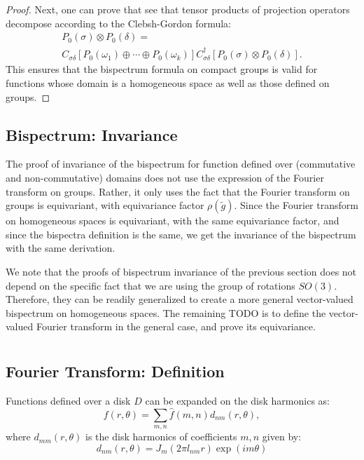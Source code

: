 \documentclass{article}
\begin{document}
\begin{proof}
Next, one can prove that see that tensor products of projection operators decompose according to the Clebsh-Gordon formula:
$$
\begin{gathered}
P_0(\sigma) \otimes P_0(\delta)= \\
C_{\sigma \delta}\left[P_0\left(\omega_1\right) \oplus \cdots \oplus P_0\left(\omega_k\right)\right] C_{\sigma \delta}^{\dagger}\left[P_0(\sigma) \otimes P_0(\delta)\right] .
\end{gathered}
$$
This ensures that the bispectrum formula on compact groups is valid for functions whose domain is a homogeneous space as well as those defined on groups.
\end{proof}

\subsection{Bispectrum: Invariance}

The proof of invariance of the bispectrum for function defined over (commutative and non-commutative) domains does not use the expression of the Fourier transform on groups. Rather, it only uses the fact that the Fourier transform on groups is equivariant, with equivariance factor $\rho(\tilde{g})$. Since the Fourier transform on homogeneous spaces is equivariant, with the same equivariance factor, and since the bispectra definition is the same, we get the invariance of the bispectrum with the same derivation.

We note that the proofs of bispectrum invariance of the previous section does not depend on the specific fact that we are using the group of rotations $SO(3)$. Therefore, they can be readily generalized to create a more general vector-valued bispectrum on homogeneous spaces. The remaining TODO is to define the vector-valued Fourier transform in the general case, and prove its equivariance.

\section{}


\subsection{Fourier Transform: Definition}

Functions defined over a disk $D$ can be expanded on the disk harmonics as:
\begin{equation}
    f(r, \theta)=\sum_{m, n} \hat{f}(m, n) d_{n m}(r, \theta),
\end{equation}
where $ d_{m m}(r, \theta)$ is the disk harmonics of coefficients $m, n$ given by:
\begin{equation}
    d_{nm}(r, \theta)= J_m(2 \pi l_{n m} r) \exp (im \theta)
\end{equation}
\end{document}
